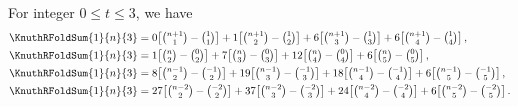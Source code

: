 \begin{example} For integer $0 \leq t \leq 3$, we have
  \begin{align*}
    \KnuthRFoldSum{1}{n}{3}
    &= 0\!\left[\tbinom{n+1}{1}-\tbinom{1}{1}\right]
    + 1\!\left[\tbinom{n+1}{2}-\tbinom{1}{2}\right]
    + 6\!\left[\tbinom{n+1}{3}-\tbinom{1}{3}\right]
    + 6\!\left[\tbinom{n+1}{4}-\tbinom{1}{4}\right], \\
    \KnuthRFoldSum{1}{n}{3}
    &= 1\!\left[\tbinom{n}{2}-\tbinom{0}{2}\right]
    + 7\!\left[\tbinom{n}{3}-\tbinom{0}{3}\right]
    + 12\!\left[\tbinom{n}{4}-\tbinom{0}{4}\right]
    + 6\!\left[\tbinom{n}{5}-\tbinom{0}{5}\right], \\
    \KnuthRFoldSum{1}{n}{3}
    &= 8\!\left[\tbinom{n-1}{2}-\tbinom{-1}{2}\right]
    + 19\!\left[\tbinom{n-1}{3}-\tbinom{-1}{3}\right]
    + 18\!\left[\tbinom{n-1}{4}-\tbinom{-1}{4}\right]
    + 6\!\left[\tbinom{n-1}{5}-\tbinom{-1}{5}\right], \\
    \KnuthRFoldSum{1}{n}{3}
    &= 27\!\left[\tbinom{n-2}{2}-\tbinom{-2}{2}\right]
    + 37\!\left[\tbinom{n-2}{3}-\tbinom{-2}{3}\right]
    + 24\!\left[\tbinom{n-2}{4}-\tbinom{-2}{4}\right]
    + 6\!\left[\tbinom{n-2}{5}-\tbinom{-2}{5}\right].
  \end{align*}
\end{example}
